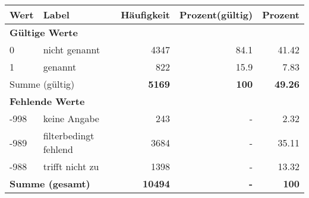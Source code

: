      \begin{longtable}{lXrrr}
     \toprule
     \textbf{Wert} & \textbf{Label} & \textbf{Häufigkeit} & \textbf{Prozent(gültig)} & \textbf{Prozent} \\
     \endhead
     \midrule
     \multicolumn{5}{l}{\textbf{Gültige Werte}}\\

     0 &
     \multicolumn{1}{X}{ nicht genannt   } &


       \num{4347} &
       \num[round-mode=places,round-precision=2]{84.1} &
         \num[round-mode=places,round-precision=2]{41.42} \\

     1 &
     \multicolumn{1}{X}{ genannt   } &


       \num{822} &
       \num[round-mode=places,round-precision=2]{15.9} &
         \num[round-mode=places,round-precision=2]{7.83} \\
     \midrule
     \multicolumn{2}{l}{Summe (gültig)} &
       \textbf{\num{5169}} &
     \textbf{\num{100}} &
       \textbf{\num[round-mode=places,round-precision=2]{49.26}} \\
     \multicolumn{5}{l}{\textbf{Fehlende Werte}}\\
       -998 &
       keine Angabe &
         \num{243} &
        - &
         \num[round-mode=places,round-precision=2]{2.32} \\
       -989 &
       filterbedingt fehlend &
         \num{3684} &
        - &
         \num[round-mode=places,round-precision=2]{35.11} \\
       -988 &
       trifft nicht zu &
         \num{1398} &
        - &
         \num[round-mode=places,round-precision=2]{13.32} \\
     \midrule
     \multicolumn{2}{l}{\textbf{Summe (gesamt)}} &
          \textbf{\num{10494}} &
        \textbf{-} &
        \textbf{\num{100}} \\
     \bottomrule
     \end{longtable}
     
